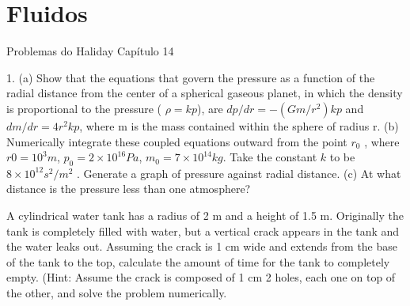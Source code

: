 \chapter{Fluidos}
Problemas do Haliday Capítulo 14

1. (a) Show that the equations that govern the pressure as a
function of the radial distance from the center of a spherical
gaseous planet, in which the density is proportional to the
pressure ( $\rho = kp$), are $dp/dr = -(Gm/r^2)kp$ and $dm/dr =
4 r^2 kp$, where m is the mass contained within the sphere of
radius r. (b) Numerically integrate these coupled equations
outward from the point $r_0$ , where $r 0 = 10^3 m$, $p_0 = 2 \times 10^{16}
Pa$, $m_0 = 7 \times 10^{14} kg$. Take the constant $k$ to be $8 \times 10^12
s^2/m^2$ . Generate a graph of pressure against radial distance. (c)
At what distance is the pressure less than one atmosphere?

A cylindrical water tank has a radius of 2 m and a height of 1.5 m.
Originally the tank is completely filled with water, but a vertical
crack appears in the tank and the water leaks out. Assuming the
crack is 1 cm wide and extends from the base of the tank to the
top, calculate the amount of time for the tank to completely
empty. (Hint: Assume the crack is composed of 1 cm 2 holes, each
one on top of the other, and solve the problem numerically.